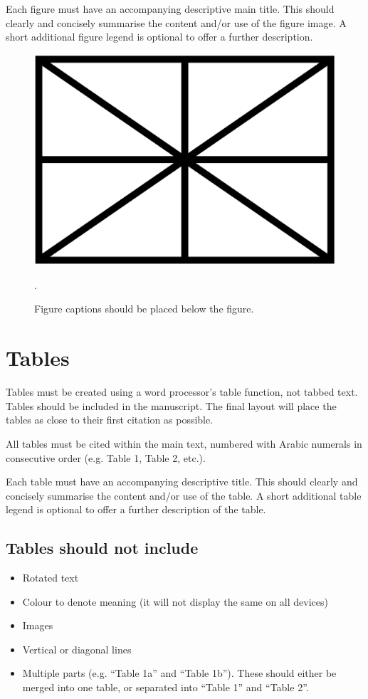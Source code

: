 \documentclass{article}
\begin{document}
Each figure must have an accompanying descriptive main title.
This should clearly and concisely summarise the content and/or
use of the figure image.
A short additional figure legend is optional to offer a further description.

\begin{figure}[htbp]
  \centering
  \includegraphics[width=0.9\columnwidth]{figure}
  \caption{Figure captions should be placed below the figure.}.
\label{fig:figure}
\end{figure}

\section{Tables}\label{sec:tables}

Tables must be created using a word processor's table function,
not tabbed text.
Tables should be included in the manuscript.
The final layout will place the tables as close to their first
citation as possible.

All tables must be cited within the main text, numbered with Arabic
numerals in consecutive order (e.g. Table 1, Table 2, etc.).

Each table must have an accompanying descriptive title.
This should clearly and concisely summarise the content and/or
use of the table.
A short additional table legend is optional to offer a further
description of the table.

\subsection{Tables should not include}

\begin{itemize}
  \item Rotated text
  \item Colour to denote meaning (it will not display the same on all devices)
  \item Images
  \item Vertical or diagonal lines
  \item Multiple parts (e.g. ``Table 1a'' and ``Table 1b'').
  These should either be merged into one table,
  or separated into ``Table 1'' and ``Table 2''.
\end{itemize}
\end{document}
